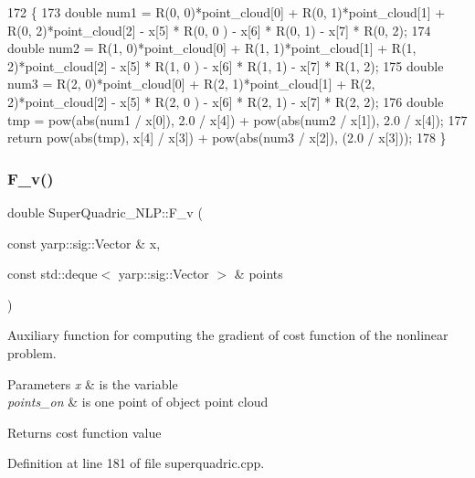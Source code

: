 \begin{DoxyCode}
172  \{
173      \textcolor{keywordtype}{double} num1 = R(0, 0)*point\_cloud[0] + R(0, 1)*point\_cloud[1] + R(0, 2)*point\_cloud[2] - x[5] * R(0, 0
      ) - x[6] * R(0, 1) - x[7] * R(0, 2);
174      \textcolor{keywordtype}{double} num2 = R(1, 0)*point\_cloud[0] + R(1, 1)*point\_cloud[1] + R(1, 2)*point\_cloud[2] - x[5] * R(1, 0
      ) - x[6] * R(1, 1) - x[7] * R(1, 2);
175      \textcolor{keywordtype}{double} num3 = R(2, 0)*point\_cloud[0] + R(2, 1)*point\_cloud[1] + R(2, 2)*point\_cloud[2] - x[5] * R(2, 0
      ) - x[6] * R(2, 1) - x[7] * R(2, 2);
176      \textcolor{keywordtype}{double} tmp = pow(abs(num1 / x[0]), 2.0 / x[4]) + pow(abs(num2 / x[1]), 2.0 / x[4]);
177      \textcolor{keywordflow}{return} pow(abs(tmp), x[4] / x[3]) + pow(abs(num3 / x[2]), (2.0 / x[3]));
178  \}
\end{DoxyCode}
\mbox{\label{classSuperQuadric__NLP_adc57687952c43086dff7b2da7c3456a8}} 
\subsubsection{\texorpdfstring{F\+\_\+v()}{F\_v()}}
{\footnotesize\ttfamily double Super\+Quadric\+\_\+\+N\+L\+P\+::\+F\+\_\+v (\begin{DoxyParamCaption}\item[{const yarp\+::sig\+::\+Vector \&}]{x,  }\item[{const std\+::deque$<$ yarp\+::sig\+::\+Vector $>$ \&}]{points }\end{DoxyParamCaption})\hspace{0.3cm}{\ttfamily [protected]}}



Auxiliary function for computing the gradient of cost function of the nonlinear problem. 


\begin{DoxyParams}{Parameters}
{\em x} & is the variable \\
\hline
{\em points\+\_\+on} & is one point of object point cloud \\
\hline
\end{DoxyParams}
\begin{DoxyReturn}{Returns}
cost function value 
\end{DoxyReturn}


Definition at line 181 of file superquadric.\+cpp.


